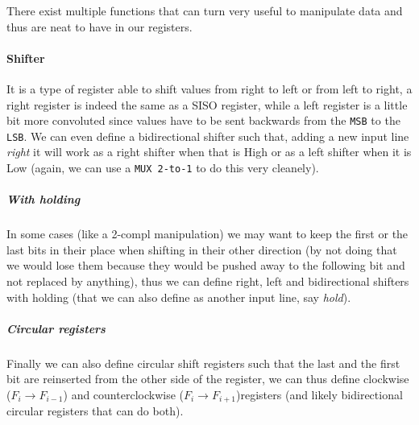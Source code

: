 \documentclass{scrartcl}
\begin{document}
    \noindent There exist multiple functions that can turn very useful to manipulate data and thus are neat to have in our registers.
    \paragraph{Shifter} It is a type of register able to shift values from right to left or from left to right, a right register is indeed the same as a SISO register, while a left register is a little bit more convoluted since values have to be sent backwards from the \texttt{MSB} to the \texttt{LSB}. We can even define a bidirectional shifter such that, adding a new input line \emph{right} it will work as a right shifter when that is High or as a left shifter when it is Low (again, we can use a \texttt{MUX 2-to-1} to do this very cleanely).
    \subparagraph{With holding} In some cases (like a 2-compl manipulation) we may want to keep the first or the last bits in their place when shifting in their other direction (by not doing that we would lose them because they would be pushed away to the following bit and not replaced by anything), thus we can define right, left and bidirectional shifters with holding (that we can also define as another input line, say \emph{hold}).
    \subparagraph{Circular registers} Finally we can also define circular shift registers such that the last and the first bit are reinserted from the other side of the register, we can thus define clockwise ($F_i\to F_{i-1}$) and counterclockwise ($F_i\to F_{i+1}$)registers (and likely bidirectional circular registers that can do both).
\end{document}
